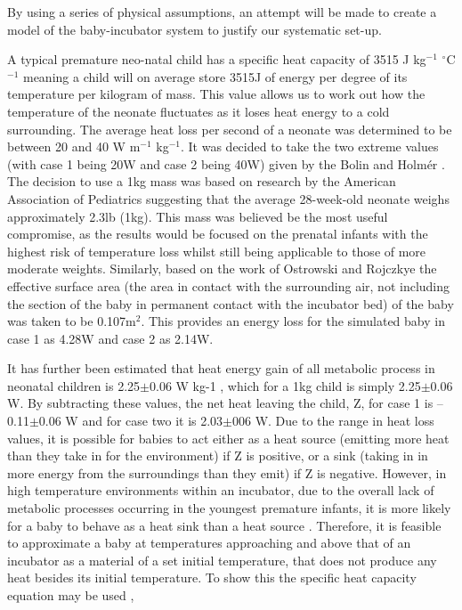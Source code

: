 \documentclass{article}
\begin{document}
By using a series of physical assumptions, an attempt will be made to create a model of the baby-incubator system to justify our systematic set-up. 

\vspace{3mm}

A typical premature neo-natal child has a specific heat capacity of 3515 J kg$^{-1}$ $^{\circ}$C$^{-1}$ \cite{BTT1} meaning a child will on average store 3515J of energy per degree of its temperature per kilogram of mass.  This value allows us to work out how the temperature of the neonate fluctuates as it loses heat energy to a cold surrounding. The average heat loss per second of a neonate was determined to be between 20 and 40 W m$^{-1}$ kg$^{-1}$. It was decided to take the two extreme values (with case 1 being 20W and case 2 being 40W) given by the Bolin and Holmér \cite{BTT5}. The decision to use a 1kg mass was based on research  by the American Association of Pediatrics \cite{BTT4} suggesting that the average 28-week-old neonate weighs approximately 2.3lb (1kg). This mass was believed be the most useful compromise, as the results would be focused on the prenatal infants with the highest risk of temperature loss whilst still being applicable to those of more moderate weights. Similarly, based on the work of Ostrowski and Rojczkye \cite{BTT2} the effective surface area (the area in contact with the surrounding air, not including the section of the baby in permanent contact with the incubator bed) of the baby was taken to be 0.107m$^{2}$.  This provides an energy loss for the simulated baby in case 1 as 4.28W and case 2 as 2.14W.    

\vspace{3mm}

It has further been estimated that heat energy gain of all metabolic process in neonatal children is 2.25$\pm$0.06 W kg-1 \cite{BTT9}, which for a 1kg child is simply 2.25$\pm$0.06 W. By subtracting these values, the net heat leaving the child, Z, for case 1 is –0.11$\pm$0.06 W and for case two it is 2.03$\pm$006 W. Due to the range in heat loss values, it is possible for babies to act either as a heat source (emitting more heat than they take in for the environment) if Z is positive, or a sink (taking in in more energy from the surroundings than they emit) if Z is negative. However, in high temperature environments within an incubator, due to the overall lack of metabolic processes occurring in the youngest premature infants, it is more likely for a baby to behave as a heat sink than a heat source \cite{BTT7}. Therefore, it is feasible to approximate a baby at temperatures approaching and above that of an incubator as a material of a set initial temperature, that does not produce any heat besides its initial temperature. To show this the specific heat capacity equation may be used , 
\end{document}
